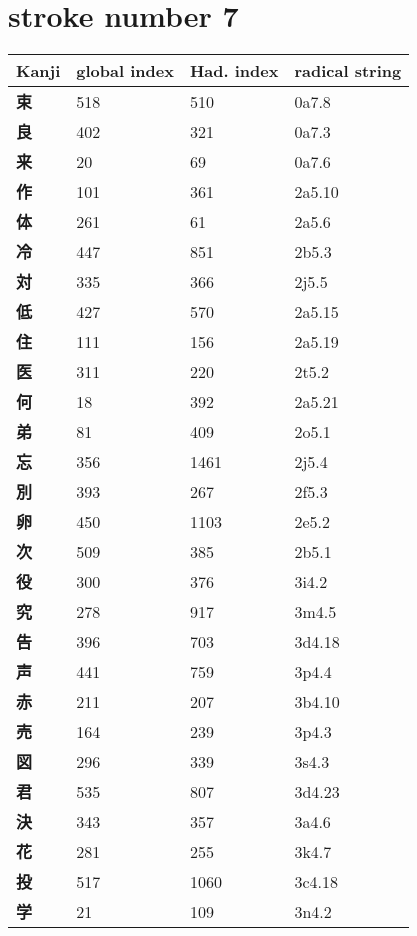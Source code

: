 \section{stroke number 7}
  \begin{longtable}[c]{llll}
    \bfseries Kanji & \bfseries global index & \bfseries Had. index & \bfseries radical string\\\hline\endhead
    \bfseries 束 & 518 & 510 & 0a7.8\\
    \bfseries 良 & 402 & 321 & 0a7.3\\
    \bfseries 来 & 20 & 69 & 0a7.6\\
    \bfseries 作 & 101 & 361 & 2a5.10\\
    \bfseries 体 & 261 & 61 & 2a5.6\\
    \bfseries 冷 & 447 & 851 & 2b5.3\\
    \bfseries 対 & 335 & 366 & 2j5.5\\
    \bfseries 低 & 427 & 570 & 2a5.15\\
    \bfseries 住 & 111 & 156 & 2a5.19\\
    \bfseries 医 & 311 & 220 & 2t5.2\\
    \bfseries 何 & 18 & 392 & 2a5.21\\
    \bfseries 弟 & 81 & 409 & 2o5.1\\
    \bfseries 忘 & 356 & 1461 & 2j5.4\\
    \bfseries 別 & 393 & 267 & 2f5.3\\
    \bfseries 卵 & 450 & 1103 & 2e5.2\\
    \bfseries 次 & 509 & 385 & 2b5.1\\
    \bfseries 役 & 300 & 376 & 3i4.2\\
    \bfseries 究 & 278 & 917 & 3m4.5\\
    \bfseries 告 & 396 & 703 & 3d4.18\\
    \bfseries 声 & 441 & 759 & 3p4.4\\
    \bfseries 赤 & 211 & 207 & 3b4.10\\
    \bfseries 売 & 164 & 239 & 3p4.3\\
    \bfseries 図 & 296 & 339 & 3s4.3\\
    \bfseries 君 & 535 & 807 & 3d4.23\\
    \bfseries 決 & 343 & 357 & 3a4.6\\
    \bfseries 花 & 281 & 255 & 3k4.7\\
    \bfseries 投 & 517 & 1060 & 3c4.18\\
    \bfseries 学 & 21 & 109 & 3n4.2\\

\end{longtable}
